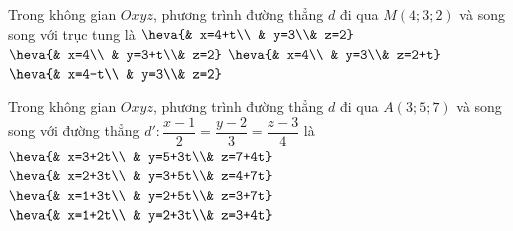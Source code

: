 \begin{ex}%
Trong không gian $Oxyz$, phương trình đường thẳng $d$ đi qua $M(4;3;2)$ và song song với trục tung là
\choice
{$\heva{& x=4+t\\ & y=3\\& z=2}$}
{\True $\heva{& x=4\\ & y=3+t\\& z=2}$}
{$\heva{& x=4\\ & y=3\\& z=2+t}$}
{$\heva{& x=4-t\\ & y=3\\& z=2}$}
\end{ex}      

\begin{ex}%
Trong không gian $Oxyz$, phương trình đường thẳng $d$ đi qua $A(3;5;7)$ và song song với đường thẳng $d' \colon \dfrac{x-1}{2}=\dfrac{y-2}{3}=\dfrac{z-3}{4}$ là
\choice
{\True $\heva{& x=3+2t\\ & y=5+3t\\& z=7+4t}$}
{$\heva{& x=2+3t\\ & y=3+5t\\& z=4+7t}$}
{$\heva{& x=1+3t\\ & y=2+5t\\& z=3+7t}$}
{$\heva{& x=1+2t\\ & y=2+3t\\& z=3+4t}$}
\end{ex}  

